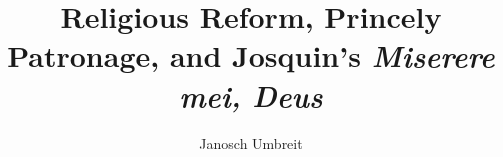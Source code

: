 
    \author{Janosch Umbreit} %
    \newcommand{\authormail}{} %
    \newcommand{\matrikelnr}{} %
    \newcommand{\authoraddress}{} %
    
    \newcommand{\city}{} %
    \newcommand{\university}{} %
    \newcommand{\faculty}{} %
    \newcommand{\department}{} %
    \newcommand{\handindate}{} %
    
    \newcommand{\tutor}{} %
    \newcommand{\coursetype}{} %
    \newcommand{\coursetitle}{} %
    \newcommand{\coursenumber}{} %
    
    \title{
        Religious Reform, Princely Patronage, and Josquin's \emph{Miserere mei, Deus}} %
    \date{}
    \newcommand{\papertype}{} %
    \newcommand{\keywords}{} %
    
    \newcommand{\mainlanguage}{UKenglish} 
    \usepackage[ngerman, \mainlanguage]{babel}
%
%
\usepackage[babel]{csquotes}


